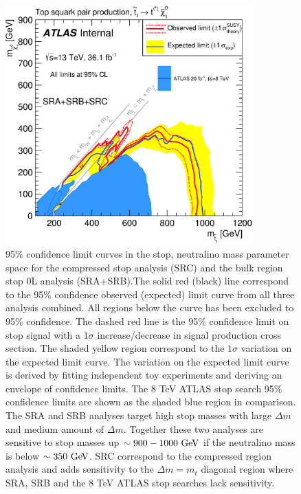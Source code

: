 \begin{figure}[h!]
	\begin{center}
		\includegraphics[width=0.85\textwidth]{figures/fit/atlascls_m0m12_wband1_showcms0_StopZL2016_SRABC_Tt_directTTplusbWN_all_Output_fixSigXSecNominal_hypotest__1_harvest_list.eps}
		\caption[95\% confidence limit curves in the stop, neutralino mass parameter space for the compressed stop analysis and the bulk region stop 0L analysis]{
		95\% confidence limit curves in the stop, neutralino mass parameter space for the compressed stop analysis (SRC) and the bulk region stop 0L analysis (SRA+SRB).The solid red (black) line correspond to the 95\% confidence observed (expected) limit curve from all three analysis combined. All regions below the curve has been excluded to 95\% confidence.  The dashed red line is the 95\% confidence limit on stop signal with a $1\sigma$ increase/decrease in signal production cross section.  The shaded yellow region correspond to the $1\sigma$ variation on the expected limit curve.  The variation on the expected limit curve is derived by fitting independent toy experiments and deriving an envelope of confidence limits.  The 8 TeV ATLAS stop search 95\% confidence limits are shown as the shaded blue region in comparison.  The SRA and SRB analyses target high stop masses with large $\Delta m$ and medium amount of $\Delta m$.  Together these two analyses are sensitive to stop masses up $\sim900-1000 \gev$ if the neutralino mass is below $\sim350 \gev$. SRC correspond to the compressed region analysis and adds sensitivity to the $\Delta m = m_{t}$ diagonal region where SRA, SRB and the 8 TeV ATLAS stop searches lack sensitivity.   }
		\label{figure.exclusion.SRABC}
	\end{center}
\end{figure}

